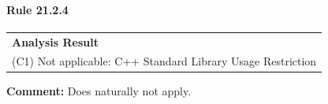 \paragraph{Rule 21.2.4}
\begin{longtable}{p{13cm}}
\textbf{Analysis Result} \\
(C1) Not applicable: C++ Standard Library Usage Restriction \\
\end{longtable}
\textbf{Comment:} Does naturally not apply. \\
